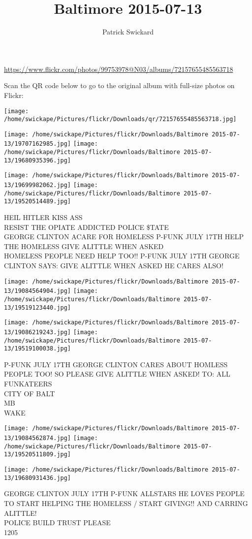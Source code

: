 \documentclass[10pt,letterpaper]{article}
\title{Baltimore 2015-07-13}
\author{Patrick Swickard}
\date{}
\begin{document}
\maketitle

\url{https://www.flickr.com/photos/99753978@N03/albums/72157655485563718}

Scan the QR code below to go to the original album with full-size photos on Flickr:

\texttt{[image: /home/swickape/Pictures/flickr/Downloads/qr/72157655485563718.jpg]}
\pagebreak

\texttt{[image: /home/swickape/Pictures/flickr/Downloads/Baltimore 2015-07-13/19707162985.jpg]}
\texttt{[image: /home/swickape/Pictures/flickr/Downloads/Baltimore 2015-07-13/19680935396.jpg]}

\texttt{[image: /home/swickape/Pictures/flickr/Downloads/Baltimore 2015-07-13/19699982062.jpg]}
\texttt{[image: /home/swickape/Pictures/flickr/Downloads/Baltimore 2015-07-13/19520514489.jpg]}

HEIL HITLER KISS ASS\\
RESIST THE OPIATE ADDICTED POLICE \$TATE\\
GEORGE CLINTON ACARE FOR HOMELESS P{-}FUNK JULY 17TH HELP THE HOMELESS GIVE ALITTLE WHEN ASKED\\
HOMELESS PEOPLE NEED HELP TOO!! P{-}FUNK JULY 17TH GEORGE CLINTON SAYS: GIVE ALITTLE WHEN ASKED HE CARES ALSO!
\pagebreak

\texttt{[image: /home/swickape/Pictures/flickr/Downloads/Baltimore 2015-07-13/19084564904.jpg]}
\texttt{[image: /home/swickape/Pictures/flickr/Downloads/Baltimore 2015-07-13/19519123440.jpg]}

\texttt{[image: /home/swickape/Pictures/flickr/Downloads/Baltimore 2015-07-13/19086219243.jpg]}
\texttt{[image: /home/swickape/Pictures/flickr/Downloads/Baltimore 2015-07-13/19519100038.jpg]}

P{-}FUNK JULY 17TH GEORGE CLINTON CARES ABOUT HOMLESS PEOPLE TOO!  SO PLEASE GIVE ALITTLE WHEN ASKED!  TO: ALL FUNKATEERS\\
CITY OF BALT\\
MB\\
WAKE
\pagebreak

\texttt{[image: /home/swickape/Pictures/flickr/Downloads/Baltimore 2015-07-13/19084562874.jpg]}
\texttt{[image: /home/swickape/Pictures/flickr/Downloads/Baltimore 2015-07-13/19520511809.jpg]}

\texttt{[image: /home/swickape/Pictures/flickr/Downloads/Baltimore 2015-07-13/19680931436.jpg]}

GEORGE CLINTON JULY 17TH P{-}FUNK ALLSTARS HE LOVES PEOPLE TO START HELPING THE HOMELESS / START GIVING!! AND CARRING ALITTLE!\\
POLICE BUILD TRUST PLEASE\\
1205
\pagebreak
\end{document}
